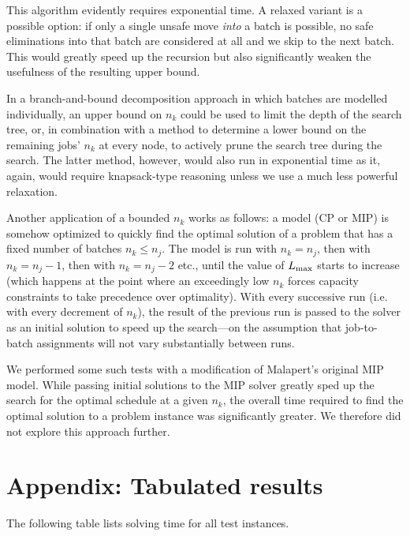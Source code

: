 \documentclass[13pt, letterpaper, oneside]{book}
\begin{document}
This algorithm evidently requires exponential time. A relaxed variant is a
possible option: if only a single unsafe move \textit{into} a batch is possible,
no safe eliminations into that batch are considered at all and we skip to the
next batch. This would greatly speed up the recursion but also significantly
weaken the usefulness of the resulting upper bound.

In a branch-and-bound decomposition approach in which batches are modelled
individually, an upper bound on $n_k$ could be used to limit the depth of the
search tree, or, in combination with a method to determine a lower bound on the
remaining jobs' $n_k$ at every node, to actively prune the search tree during
the search. The latter method, however, would also run in exponential time as
it, again, would require knapsack-type reasoning unless we use a much less powerful
relaxation.

Another application of a bounded $n_k$ works as follows: a model (CP or MIP) is
somehow optimized to quickly find the optimal solution of a problem that has a
fixed number of batches $n_k \leq n_j$. The model is run with $n_k = n_j$, then
with $n_k = n_j - 1$, then with $n_k = n_j - 2$ etc., until the value of $L_{\text{max}}$
starts to increase (which happens at the point where an exceedingly low $n_k$
forces capacity constraints to take precedence over optimality). With every
successive run (i.e. with every decrement of $n_k$), the result of the previous
run is passed to the solver as an initial solution to speed up the search---on
the assumption that job-to-batch assignments will not vary substantially between
runs.

We performed some such tests with a modification of Malapert's original MIP
model. While passing initial solutions to the MIP solver greatly sped up the
search for the optimal schedule at a given $n_k$, the overall time required to
find the optimal solution to a problem instance was significantly greater. We
therefore did not explore this approach further.

\chapter{Appendix: Tabulated results}

The following table lists solving time for all test instances.
\end{document}
